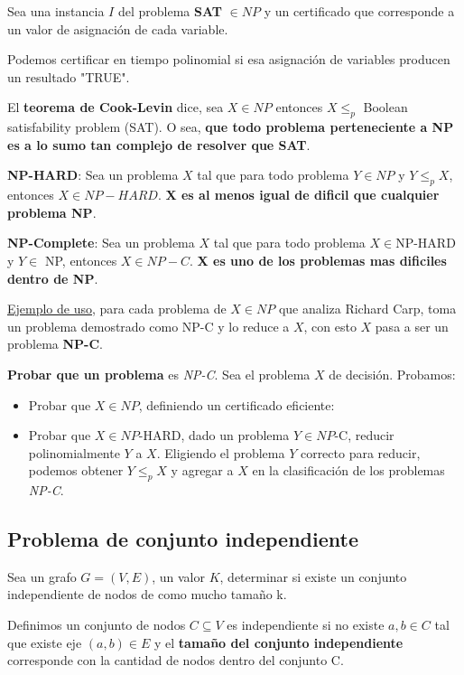 \documentclass{article}
\begin{document}
Sea una instancia \(I\) del problema \textbf{SAT} \(\in NP\) y un certificado que corresponde a un valor
de asignación de cada variable.

Podemos certificar en tiempo polinomial si esa asignación de variables producen un resultado "TRUE".

El \textbf{teorema de Cook-Levin} dice, sea \(X \in NP\) entonces \(X \leq_p\) Boolean satisfability problem (SAT). 
O sea, \textbf{que todo problema perteneciente a NP es a lo sumo tan complejo de resolver que SAT}.
 
\textbf{NP-HARD}: Sea un problema \(X\) tal que para todo problema \(Y \in NP\) y \(Y \leq_p X\), entonces \(X \in NP-HARD\).
\textbf{X es al menos igual de dificil que cualquier problema NP}.

\textbf{NP-Complete}: Sea un problema \(X\) tal que para todo problema \(X \in\)NP-HARD y \(Y \in \) NP, entonces \(X \in NP-C\).
\textbf{X es uno de los problemas mas dificiles dentro de NP}.

\underline{Ejemplo de uso}, para cada problema de \(X \in NP\) que analiza Richard Carp, toma un problema 
demostrado como NP-C y lo reduce a \(X\), con esto \(X\) pasa a ser un problema \textbf{NP-C}.

\textbf{Probar que un problema} es \textit{NP-C}. Sea el problema \(X\) de decisión. Probamos:

\begin{itemize}
    \item Probar que \(X \in NP\), definiendo un certificado eficiente:
    \item Probar que \(X \in NP\)-HARD, dado un problema \(Y \in NP\)-C, 
    reducir polinomialmente \(Y\) a \(X\). Eligiendo el problema \(Y\) correcto para reducir, 
    podemos obtener \(Y \leq_p X\) y agregar a \(X\) en la clasificación de los problemas \textit{NP-C}.
\end{itemize}


\subsection{Problema de conjunto independiente}

Sea un grafo \(G=(V,E)\), un valor \(K\), determinar si existe un conjunto independiente de nodos 
de como mucho tamaño k.

Definimos un conjunto de nodos \(C \subseteq V\) es independiente si no existe \(a,b \in C\) tal que existe eje \((a,b) \in E\) 
y el \textbf{tamaño del conjunto independiente} corresponde con la cantidad de nodos dentro del conjunto C.
\end{document}
